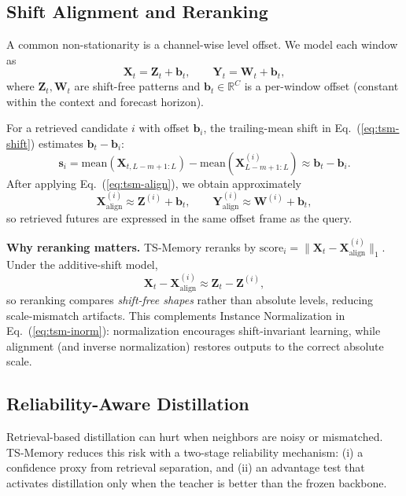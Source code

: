 \subsection{Shift Alignment and Reranking}
\label{subsec:shift}

A common non-stationarity is a channel-wise level offset. We model each window as
\[
\mathbf{X}_t = \mathbf{Z}_t + \mathbf{b}_t,
\qquad
\mathbf{Y}_t = \mathbf{W}_t + \mathbf{b}_t,
\]
where $\mathbf{Z}_t,\mathbf{W}_t$ are shift-free patterns and $\mathbf{b}_t\in\mathbb{R}^{C}$ is a per-window
offset (constant within the context and forecast horizon).

For a retrieved candidate $i$ with offset $\mathbf{b}_i$, the trailing-mean shift in Eq.~(\ref{eq:tsm-shift})
estimates $\mathbf{b}_t-\mathbf{b}_i$:
\[
\boldsymbol{s}_i
=
\mathrm{mean}\!\left(\mathbf{X}_{t,L-m+1:L}\right)
-
\mathrm{mean}\!\left(\mathbf{X}^{(i)}_{L-m+1:L}\right)
\approx
\mathbf{b}_t-\mathbf{b}_i.
\]
After applying Eq.~(\ref{eq:tsm-align}), we obtain approximately
\begin{equation}
\mathbf{X}^{(i)}_{\text{align}} \approx \mathbf{Z}^{(i)} + \mathbf{b}_t,
\qquad
\mathbf{Y}^{(i)}_{\text{align}} \approx \mathbf{W}^{(i)} + \mathbf{b}_t,
\end{equation}
so retrieved futures are expressed in the same offset frame as the query.

\noindent\textbf{Why reranking matters.}
TS-Memory reranks by $\text{score}_i=\|\mathbf{X}_t-\mathbf{X}^{(i)}_{\text{align}}\|_1$.
Under the additive-shift model,
\[
\mathbf{X}_t-\mathbf{X}^{(i)}_{\text{align}}
\approx
\mathbf{Z}_t-\mathbf{Z}^{(i)},
\]
so reranking compares \emph{shift-free shapes} rather than absolute levels, reducing scale-mismatch artifacts.
This complements Instance Normalization in Eq.~(\ref{eq:tsm-inorm}): normalization encourages shift-invariant
learning, while alignment (and inverse normalization) restores outputs to the correct absolute scale.

\subsection{Reliability-Aware Distillation}
\label{subsec:reliability}

Retrieval-based distillation can hurt when neighbors are noisy or mismatched. TS-Memory reduces this risk
with a two-stage reliability mechanism: (i) a confidence proxy from retrieval separation, and (ii) an
advantage test that activates distillation only when the teacher is better than the frozen backbone.

